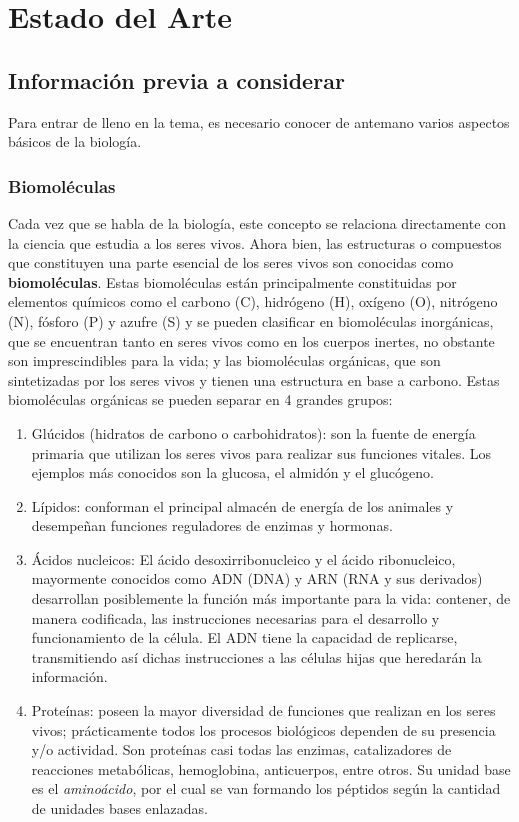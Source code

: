 \chapter{Estado del Arte}

\section{Información previa a considerar}

Para entrar de lleno en la tema, es necesario conocer de antemano varios aspectos básicos de la biología.

\subsection{Biomoléculas}

Cada vez que se habla de la biología, este concepto se relaciona directamente con la ciencia que estudia a los seres vivos. Ahora bien, las estructuras o compuestos que constituyen una parte esencial de los seres vivos son conocidas como \textbf{biomoléculas}. Estas biomoléculas están principalmente constituidas por elementos químicos como el carbono (C), hidrógeno (H), oxígeno (O), nitrógeno (N), fósforo (P) y azufre (S) \cite{biomolecula} y se pueden clasificar en biomoléculas inorgánicas, que se encuentran tanto en seres vivos como en los cuerpos inertes, no obstante son imprescindibles para la vida; y las biomoléculas orgánicas, que son sintetizadas por los seres vivos y tienen una estructura en base a carbono. Estas biomoléculas orgánicas se pueden separar en 4 grandes grupos:
\begin{enumerate}
\item Glúcidos (hidratos de carbono o carbohidratos): son la fuente de energía primaria que utilizan los seres vivos para realizar sus funciones vitales. Los ejemplos más conocidos son la glucosa, el almidón y el glucógeno.
\item Lípidos: conforman el principal almacén de energía de los animales y desempeñan funciones reguladores de enzimas y hormonas.
\item Ácidos nucleicos: El ácido desoxirribonucleico y el ácido ribonucleico, mayormente conocidos como ADN (DNA) y ARN (RNA y sus derivados) desarrollan posiblemente la función más importante para la vida: contener, de manera codificada, las instrucciones necesarias para el desarrollo y funcionamiento de la célula. El ADN tiene la capacidad de replicarse, transmitiendo así dichas instrucciones a las células hijas que heredarán la información.
\item Proteínas: poseen la mayor diversidad de funciones que realizan en los seres vivos; prácticamente todos los procesos biológicos dependen de su presencia y/o actividad. Son proteínas casi todas las enzimas, catalizadores de reacciones metabólicas, hemoglobina, anticuerpos, entre otros. Su unidad base es el {\it{aminoácido}}, por el cual se van formando los péptidos según la cantidad de unidades bases enlazadas.
\end{enumerate}

